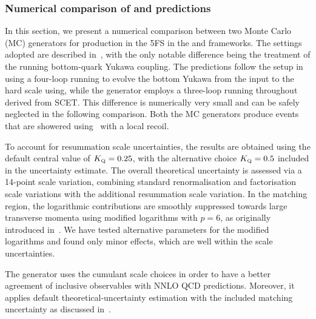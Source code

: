 \documentclass[11pt,a4paper]{article}
\begin{document}
\subsubsection{Numerical comparison of \minnlo{} and \GENEVA{} predictions}
In this section, we present a numerical comparison between two Monte Carlo (MC) generators for \bbtoH{} production in the 5FS in the \minnlo{} and \GENEVA{} frameworks. The settings adopted are described in~, with the only notable difference being the treatment of the running bottom-quark Yukawa coupling. 
The \minnlo{} predictions follow the setup in  using a four-loop running 
\cite{harlander:2002wh,baikov_2014} to evolve the bottom Yukawa from 
the input to the hard scale using, while the \GENEVA{} generator employs a three-loop running throughout derived from SCET. This difference is numerically very small and can be safely neglected in the following comparison. Both the MC generators produce events that are showered using~ with a local recoil.

To account for resummation scale uncertainties, the \minnlo{} results are obtained using the default central value of $\KQ = 0.25$, with the alternative choice $\KQ = 0.5$ included in the uncertainty estimate. The overall theoretical uncertainty is assessed via a 14-point scale variation, combining standard renormalisation and factorisation scale variations with the additional resummation scale variation. In the matching region, the logarithmic contributions are smoothly suppressed towards large transverse momenta using modified logarithms with $p=6$, as originally introduced in~. We have tested alternative parameters for the modified logarithms and found only minor effects, which are well within the \minnlo{} scale uncertainties.

The \GENEVA{} generator uses the cumulant scale choices in order to have a better agreement of inclusive observables with NNLO QCD predictions. Moreover, it applies default theoretical-uncertainty estimation with the included matching uncertainty as discussed in~.
\end{document}
